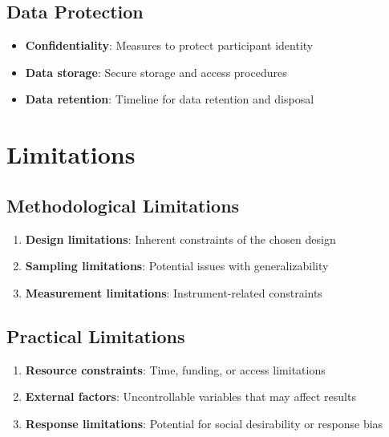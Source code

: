 \documentclass[
  12pt,
  letterpaper,
  12pt,
  letterpaper,
  oneside]{report}
\providecommand{\tightlist}{%
  \setlength{\itemsep}{0pt}\setlength{\parskip}{0pt}}
\begin{document}
\subsection{Data Protection}\label{data-protection}

\begin{itemize}
\tightlist
\item
  \textbf{Confidentiality}: Measures to protect participant identity
\item
  \textbf{Data storage}: Secure storage and access procedures
\item
  \textbf{Data retention}: Timeline for data retention and disposal
\end{itemize}

\section{Limitations}\label{limitations}

\subsection{Methodological
Limitations}\label{methodological-limitations}

\begin{enumerate}
\def\labelenumi{\arabic{enumi}.}
\tightlist
\item
  \textbf{Design limitations}: Inherent constraints of the chosen design
\item
  \textbf{Sampling limitations}: Potential issues with generalizability
\item
  \textbf{Measurement limitations}: Instrument-related constraints
\end{enumerate}

\subsection{Practical Limitations}\label{practical-limitations}

\begin{enumerate}
\def\labelenumi{\arabic{enumi}.}
\tightlist
\item
  \textbf{Resource constraints}: Time, funding, or access limitations
\item
  \textbf{External factors}: Uncontrollable variables that may affect
  results
\item
  \textbf{Response limitations}: Potential for social desirability or
  response bias
\end{enumerate}
\end{document}
